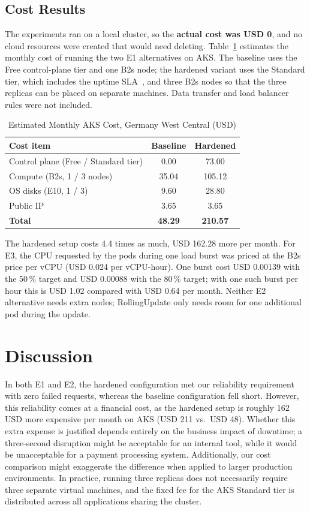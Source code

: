 \documentclass[conference,a4paper]{IEEEtran}
\begin{document}
\subsection{Cost Results}
The experiments ran on a local cluster, so the \textbf{actual cost was USD 0}, and no cloud resources were created that would need deleting. Table~\ref{tab:cost} estimates the monthly cost of running the two E1 alternatives on AKS. The baseline uses the Free control-plane tier and one B2s node; the hardened variant uses the Standard tier, which includes the uptime SLA~\cite{aksTiers}, and three B2s nodes so that the three replicas can be placed on separate machines. Data transfer and load balancer rules were not included.

\begin{table}[htbp]
	\caption{Estimated Monthly AKS Cost, Germany West Central (USD)}
	\label{tab:cost}
	\centering
	\footnotesize
	\begin{tabular}{|l|c|c|}
		\hline
		\textbf{Cost item} & \textbf{Baseline} & \textbf{Hardened} \\
		\hline
		Control plane (Free / Standard tier) & 0.00 & 73.00 \\
		\hline
		Compute (B2s, 1 / 3 nodes) & 35.04 & 105.12 \\
		\hline
		OS disks (E10, 1 / 3) & 9.60 & 28.80 \\
		\hline
		Public IP & 3.65 & 3.65 \\
		\hline
		\textbf{Total} & \textbf{48.29} & \textbf{210.57} \\
		\hline
	\end{tabular}
\end{table}
The hardened setup costs 4.4 times as much, USD 162.28 more per month. For E3, the CPU requested by the pods during one load burst was priced at the B2s price per vCPU (USD 0.024 per vCPU-hour). One burst cost USD 0.00139 with the 50\,\% target and USD 0.00088 with the 80\,\% target; with one such burst per hour this is USD 1.02 compared with USD 0.64 per month. Neither E2 alternative needs extra nodes; RollingUpdate only needs room for one additional pod during the update.

\section{Discussion}
\label{sec:discussion}
In both E1 and E2, the hardened configuration met our reliability requirement with zero failed requests, whereas the baseline configuration fell short. However, this reliability comes at a financial cost, as the hardened setup is roughly 162 USD more expensive per month on AKS (USD 211 vs.\ USD 48). Whether this extra expense is justified depends entirely on the business impact of downtime; a three-second disruption might be acceptable for an internal tool, while it would be unacceptable for a payment processing system. Additionally, our cost comparison might exaggerate the difference when applied to larger production environments. In practice, running three replicas does not necessarily require three separate virtual machines, and the fixed fee for the AKS Standard tier is distributed across all applications sharing the cluster.
\end{document}
